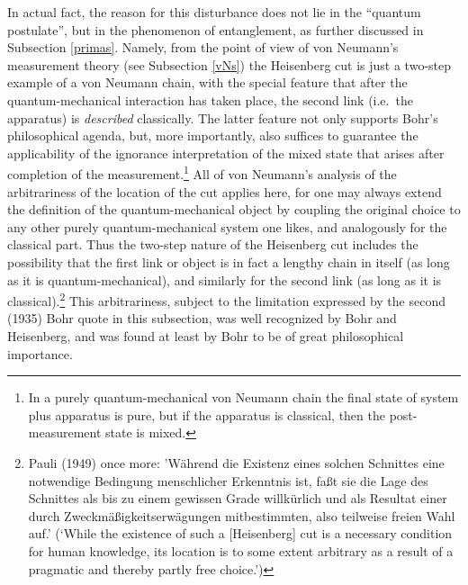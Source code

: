 \documentclass[12pt]{article}
\begin{document}
In actual fact, the reason for this disturbance does not lie in the    ``quantum postulate'',  but in the phenomenon of entanglement, as further discussed in Subsection  \ref{primas}.
Namely, from the point of view of von Neumann's measurement theory (see Subsection \ref{vNs})
 the Heisenberg cut is just a two-step example of a von Neumann chain, with the special feature that after the quantum-mechanical interaction has taken place, the second link (i.e.\ the apparatus) is {\it described} classically.
The latter feature not only supports  Bohr's philosophical agenda, but, more importantly,
also suffices to guarantee the applicability of the ignorance interpretation of the mixed state that arises after completion of the measurement.\footnote{In a purely quantum-mechanical von Neumann chain the final state of system plus apparatus is pure, but if the
apparatus  is classical, then  the post-measurement state is mixed.} 
 All of von Neumann's analysis of the arbitrariness of the location of the cut applies here, for  one may always extend the definition of the quantum-mechanical object by coupling the original choice to any other purely quantum-mechanical system one likes, and analogously for the classical part. Thus the two-step nature of the Heisenberg cut includes the possibility that the first link or object is in fact a lengthy chain in itself (as long as it is quantum-mechanical), and similarly for the second link (as long as it is classical).\footnote{\label{PFN2} Pauli (1949) once more: 'W\"{a}hrend die {\sc Existenz} eines solchen Schnittes eine notwendige Bedingung menschlicher Erkenntnis ist, fa\ss t sie die {\sc Lage} des Schnittes als bis zu einem gewissen Grade willk\"{u}rlich und als Resultat einer durch Zweckm\"{a}\ss igkeitserw\"{a}gungen mitbestimmten, also teilweise freien Wahl auf.'
(`While the {\sc existence} of such a [Heisenberg] cut is a necessary condition for human knowledge,
its {\sc location} is to some extent arbitrary as a result of a pragmatic and thereby partly 
free choice.')} This arbitrariness, subject to the limitation expressed by the second (1935) Bohr quote in this subsection, was well recognized by Bohr and Heisenberg, and was found at least by Bohr to be of great philosophical importance. 
\end{document}
